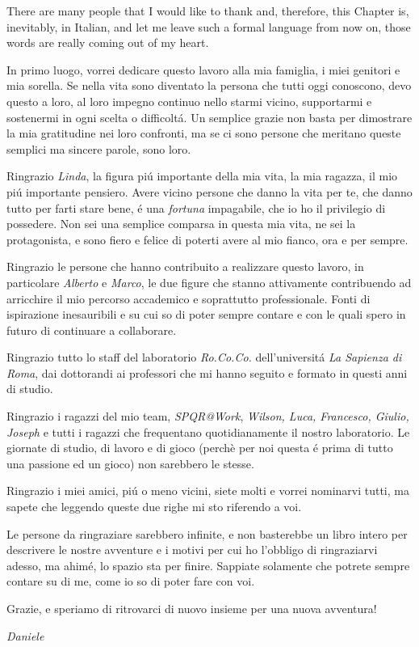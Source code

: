 \newpage

\begin{acknowledgements}
There are many people that I would like to thank and, therefore, this Chapter is, inevitably, in Italian, and let me leave such a formal language from now on, those words are really coming out of my heart.

In primo luogo, vorrei dedicare questo lavoro alla mia famiglia, i miei genitori e mia sorella. Se nella vita sono diventato la persona che tutti oggi conoscono, devo questo a loro, al loro impegno continuo nello starmi vicino, supportarmi e sostenermi in ogni scelta o difficolt\'a. Un semplice grazie non basta per dimostrare la mia gratitudine nei loro confronti, ma se ci sono persone che meritano queste semplici ma sincere parole, sono loro.

Ringrazio \emph{Linda}, la figura pi\'u importante della mia vita, la mia ragazza, il mio pi\'u importante pensiero. Avere vicino persone che danno la vita per te, che danno tutto per farti stare bene, \'e una \emph{fortuna} impagabile, che io ho il privilegio di possedere. Non sei una semplice comparsa in questa mia vita, ne sei la protagonista, e sono fiero e felice di poterti avere al mio fianco, ora e per sempre.

Ringrazio le persone che hanno contribuito a realizzare questo lavoro, in particolare \emph{Alberto} e \emph{Marco}, le due figure che stanno attivamente contribuendo ad arricchire il mio percorso accademico e soprattutto professionale. Fonti di ispirazione inesauribili e su cui so di poter sempre contare e con le quali spero in futuro di continuare a collaborare.

Ringrazio tutto lo staff del laboratorio \emph{Ro.Co.Co.} dell'universit\'a \emph{La Sapienza di Roma}, dai dottorandi ai professori che mi hanno seguito e formato in questi anni di studio.

Ringrazio i ragazzi del mio team, \emph{SPQR@Work}, \emph{Wilson, Luca, Francesco, Giulio, Joseph} e tutti i ragazzi che frequentano quotidianamente il nostro laboratorio. Le giornate di studio, di lavoro e di gioco (perchè per noi questa \'e prima di tutto una passione ed un gioco) non sarebbero le stesse.

Ringrazio i miei amici, pi\'u o meno vicini, siete molti e vorrei nominarvi tutti, ma sapete che leggendo queste due righe mi sto riferendo a voi.

Le persone da ringraziare sarebbero infinite, e non basterebbe un libro intero per descrivere le nostre avventure e i motivi per cui ho l'obbligo di ringraziarvi adesso, ma ahim\'e, lo spazio sta per finire. Sappiate solamente che potrete sempre contare su di me, come io so di poter fare con voi.

Grazie, e speriamo di ritrovarci di nuovo insieme per una nuova avventura!

\emph{Daniele}
\end{acknowledgements}